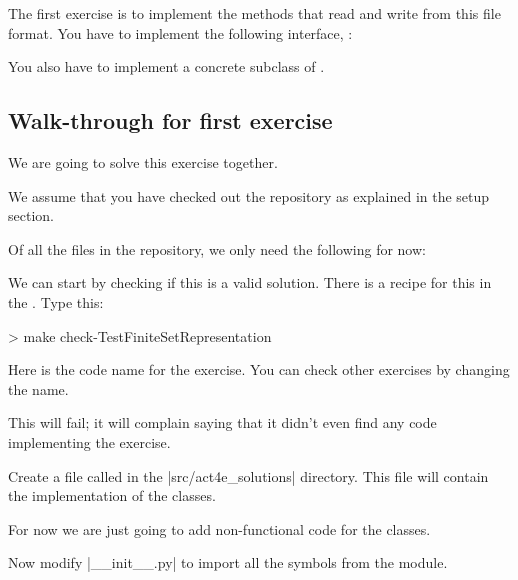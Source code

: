 \begin{gradedexercise}
  \label{ex:setrepr}
  The first exercise is to implement the methods that read and write from this file format.
  You have to implement the following interface, :


  You also have to implement a concrete subclass of .
\end{gradedexercise}

\subsection{Walk-through for first exercise}

We are going to solve this exercise together.

We assume that you have checked out the repository as explained in the setup section.

Of all the files in the repository, we only need the following for now:
%
%



We can start by checking if this is a valid solution. There is a recipe for this in the .
Type this:

\begin{console}
  > make check-TestFiniteSetRepresentation
\end{console}

Here  is the code name for the exercise. You can check other exercises by changing the name.

This will fail; it will complain saying that it didn't even find any code implementing the exercise.


Create a file called  in the \files|src/act4e_solutions| directory.
This file will contain the implementation of the classes.

For now we are just going to add non-functional code for the classes.


Now modify \files|__init__.py| to import all the symbols from the  module.

